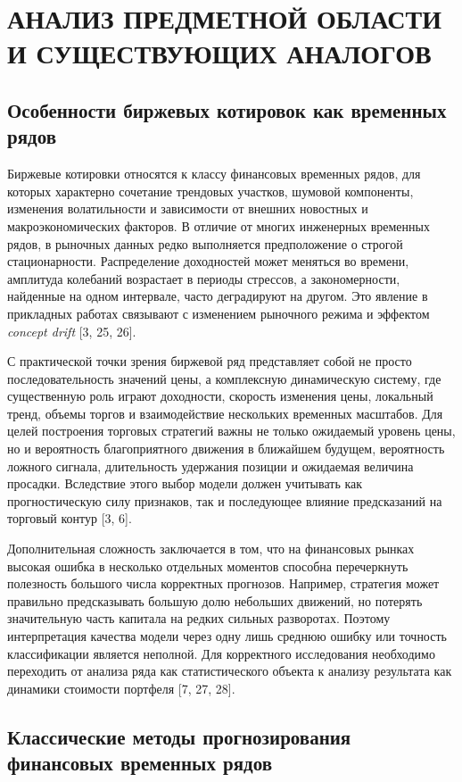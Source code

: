 \clearpage
\section{АНАЛИЗ ПРЕДМЕТНОЙ ОБЛАСТИ И СУЩЕСТВУЮЩИХ АНАЛОГОВ}

\subsection{Особенности биржевых котировок как временных рядов}

Биржевые котировки относятся к классу финансовых временных рядов, для которых характерно сочетание трендовых участков, шумовой компоненты, изменения волатильности и зависимости от внешних новостных и макроэкономических факторов. В отличие от многих инженерных временных рядов, в рыночных данных редко выполняется предположение о строгой стационарности. Распределение доходностей может меняться во времени, амплитуда колебаний возрастает в периоды стрессов, а закономерности, найденные на одном интервале, часто деградируют на другом. Это явление в прикладных работах связывают с изменением рыночного режима и эффектом \textit{concept drift} [3, 25, 26].

С практической точки зрения биржевой ряд представляет собой не просто последовательность значений цены, а комплексную динамическую систему, где существенную роль играют доходности, скорость изменения цены, локальный тренд, объемы торгов и взаимодействие нескольких временных масштабов. Для целей построения торговых стратегий важны не только ожидаемый уровень цены, но и вероятность благоприятного движения в ближайшем будущем, вероятность ложного сигнала, длительность удержания позиции и ожидаемая величина просадки. Вследствие этого выбор модели должен учитывать как прогностическую силу признаков, так и последующее влияние предсказаний на торговый контур [3, 6].

Дополнительная сложность заключается в том, что на финансовых рынках высокая ошибка в несколько отдельных моментов способна перечеркнуть полезность большого числа корректных прогнозов. Например, стратегия может правильно предсказывать большую долю небольших движений, но потерять значительную часть капитала на редких сильных разворотах. Поэтому интерпретация качества модели через одну лишь среднюю ошибку или точность классификации является неполной. Для корректного исследования необходимо переходить от анализа ряда как статистического объекта к анализу результата как динамики стоимости портфеля [7, 27, 28].

\subsection{Классические методы прогнозирования финансовых временных рядов}

